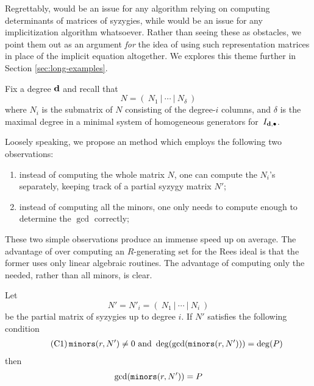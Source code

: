 \documentclass[fleqn,reqno]{amsart}
\numberwithin{first}{chapter}
\begin{document}
\begin{paragraf*}
Regrettably,
 would be an issue for any algorithm
relying on computing determinants of matrices of syzygies,
while 
would be an issue for any implicitization algorithm whatsoever.
Rather than seeing these as obstacles,
we point them out as an argument {\em for} the idea of using such
representation matrices in place of the implicit equation altogether.
We explores this theme further in Section \ref{sec:long-examples}.
\end{paragraf*}

\begin{paragraf}
\label{par:proposed}
Fix a degree $\mathbf d$ and recall that
\[
	N=(~N_1~|~\cdots~|~N_\delta~)
\]
where $N_i$ is the submatrix of $N$ consisting of the degree-$i$ columns,
and $\delta$ is the maximal degree in a minimal system of homogeneous generators
for~$I_{\mathbf d,\bullet}$.

Loosely speaking, we propose an method which employs the following two observations:
\begin{enumerate}
\item
\label{itm:N'}
instead of computing the whole matrix $N$, one can compute the $N_i$'s separately,
keeping track of a partial syzygy matrix $N'$;
\item
\label{itm:gcd}
instead of computing all the minors, one only needs to compute enough to determine
the $\gcd$ correctly;
\end{enumerate}
\end{paragraf}

\begin{paragraf*}
These two simple observations produce an immense speed up on average.
The advantage of  over computing an $R$-generating set for the
Rees ideal is that the former uses only linear algebraic routines.
The advantage of computing only the needed, rather than all minors, is clear.
\end{paragraf*}

\begin{lemma}
\label{lemma:C1}
Let
\[
	N'=N'_i=(~N_1~|~\cdots~|~N_i~)
\]
be the partial matrix of syzygies up to degree $i$.
If $N'$ satisfies the following condition
\begin{align}
	\label{C:OK-matrix}
	\tag{C1}
	\mathop{\tt minors}(r,N')\neq0 \text{ and } \deg(\gcd(\mathop{\tt minors}(r,N')))=\deg(P)
\end{align}
then
\[
\gcd(\mathop{\tt minors}(r,N'))=P
\]
\end{lemma}
\end{document}

